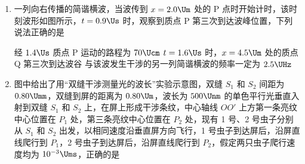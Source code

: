 \documentclass[\gkver]{gaokaozhenti}
\begin{document}
\begin{enumerate}
{原子核中所有核子单独存在时，质量总和大于该原子核的总质量}
{在 LC 振荡电路中，电容器刚放电时电容器极板上电量最多，回路电流最小}
{处于 $n=4$ 激发态的氢原子，共能辐射出四种不同频率的光子}


\item
一列向右传播的简谐横波，当波传到 $x=2.0\Um$ 处的 P 点时开始计时，该时刻波形如图所示，$t=0.9\Us$ 时，观察到质点 P 第三次到达波峰位置，下列说法正确的是

\onepicture[w=7.92cm]{}

{经 $1.4\Us$ 质点 P 运动的路程为 $70\Ucm$}
{$t=1.6\Us$ 时，$x=4.5\Um$ 处的质点 Q 第三次到达波谷}
{与该波发生干涉的另一列简谐横波的频率一定为 $2.5\UHz$}


\item
图中给出了用“双缝干涉测量光的波长”实验示意图，双缝 $S_{1}$ 和 $S_{2}$ 间距为 $0.80\Umm$，双缝到屏的距离为 $0.80\Um$，波长为 $500\Unm$ 的单色平行光垂直入射到双缝 $S_{1}$ 和 $S_{2}$ 上，在屏上形成干涉条纹，中心轴线 $OO'$ 上方第一条亮纹中心位置在 $P_{1}$ 处，第三条亮纹中心位置在 $P_{2}$ 处，现有 1 号、2 号虫子分别从 $S_{1}$ 和 $S_{2}$ 出发，以相同速度沿垂直屏方向飞行，1 号虫子到达屏后，沿屏直线爬行到 $P_{1}$，2 号虫子到达屏后，沿屏直线爬行到 $P_{2}$，假定两只虫子爬行速度均为 $10^{-3}\Ums$，正确的是


\end{enumerate}
\end{document}
